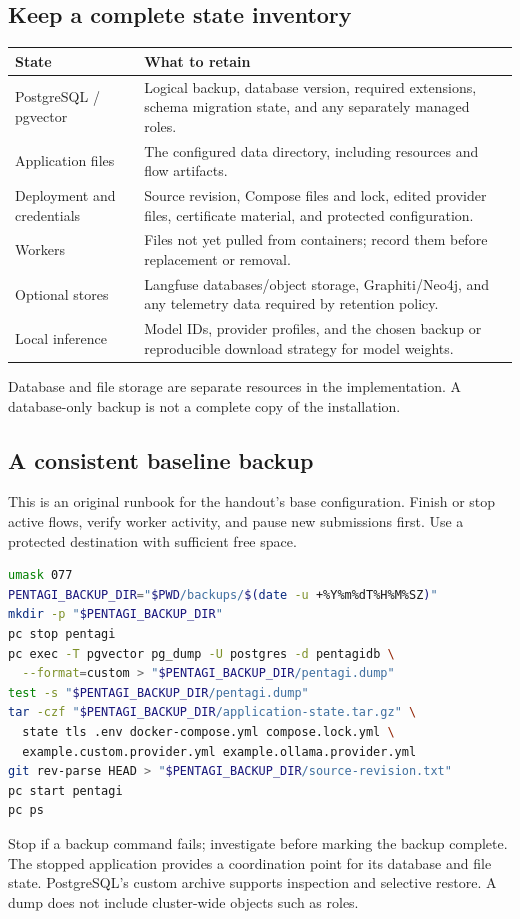 \documentclass[11pt,letterpaper]{article}
\newcommand{\src}[1]{\cite{#1}}
\begin{document}
\subsection{Keep a complete state inventory}
\begin{tabularx}{\textwidth}{@{}L{0.30\textwidth}Y@{}}
\toprule
\textbf{State} & \textbf{What to retain}\\
\midrule
PostgreSQL / pgvector &
Logical backup, database version, required extensions, schema migration state,
and any separately managed roles.\\
Application files &
The configured data directory, including resources and flow artifacts.\\
Deployment and credentials &
Source revision, Compose files and lock, edited provider files, certificate
material, and protected configuration.\\
Workers &
Files not yet pulled from containers; record them before replacement or removal.\\
Optional stores &
Langfuse databases/object storage, Graphiti/Neo4j, and any telemetry data required
by retention policy.\\
Local inference &
Model IDs, provider profiles, and the chosen backup or reproducible download
strategy for model weights.\\
\bottomrule
\end{tabularx}
Database and file storage are separate resources in the implementation.
A database-only backup is not a complete copy of the installation.
\src{database,files,compose}

\subsection{A consistent baseline backup}
This is an original runbook for the handout's base configuration. Finish or stop
active flows, verify worker activity, and pause new submissions first.
Use a protected destination with sufficient free space.
\begin{lstlisting}[language=bash]
umask 077
PENTAGI_BACKUP_DIR="$PWD/backups/$(date -u +%Y%m%dT%H%M%SZ)"
mkdir -p "$PENTAGI_BACKUP_DIR"
pc stop pentagi
pc exec -T pgvector pg_dump -U postgres -d pentagidb \
  --format=custom > "$PENTAGI_BACKUP_DIR/pentagi.dump"
test -s "$PENTAGI_BACKUP_DIR/pentagi.dump"
tar -czf "$PENTAGI_BACKUP_DIR/application-state.tar.gz" \
  state tls .env docker-compose.yml compose.lock.yml \
  example.custom.provider.yml example.ollama.provider.yml
git rev-parse HEAD > "$PENTAGI_BACKUP_DIR/source-revision.txt"
pc start pentagi
pc ps
\end{lstlisting}
Stop if a backup command fails; investigate before marking the backup complete.
The stopped application provides a coordination point for its database and
file state. PostgreSQL's custom archive supports inspection and selective
restore. A dump does not include cluster-wide objects such as roles.
\src{pgdump}
\end{document}
